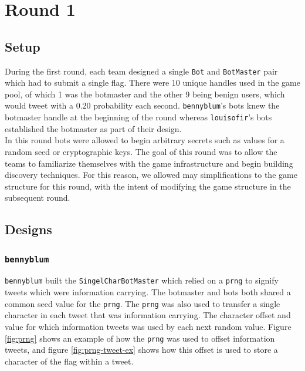 \documentclass[11pt, oneside]{article} %
\numberwithin{equation}{section} %
\numberwithin{figure}{section} %
\numberwithin{table}{section} %
\renewcommand{\c}[1]{\texttt{#1}}
\newcommand{\teambb}{\c{bennyblum}}
\newcommand{\teamol}{\c{louisofir}}
\begin{document}
	

\section{Round 1}
	\subsection{Setup}
		During the first round, each team designed a single \c{Bot} and \c{BotMaster} pair which had to submit a single flag. There were 10 unique handles used in the game pool, of which 1 was the botmaster and the other 9 being benign users, which would tweet with a $0.20$ probability each second. \teambb{}'s bots knew the botmaster handle at the beginning of the round whereas \teamol{}'s bots established the botmaster as part of their design. \\

		In this round bots were allowed to begin arbitrary secrets such as values for a random seed or cryptographic keys. The goal of this round was to allow the teams to familiarize themselves with the game infrastructure and begin building discovery techniques. For this reason, we allowed may simplifications to the game structure for this round, with the intent of modifying the game structure in the subsequent round. 

	\subsection{Designs}
		\subsubsection{\teambb{}}
			\teambb{} built the \c{SingelCharBotMaster} which relied on a \c{prng} to signify tweets which were information carrying. The botmaster and bots both shared a common seed value for the \c{prng}. The \c{prng} was also used to transfer a single character in each tweet that was information carrying. The character offset and value for which information tweets was used by each next random value. Figure \ref{fig:prng} shows an example of how the \c{prng} was used to offset information tweets, and figure \ref{fig:prng-tweet-ex} shows how this offset is used to store a character of the flag within a tweet. \\
\end{document}
